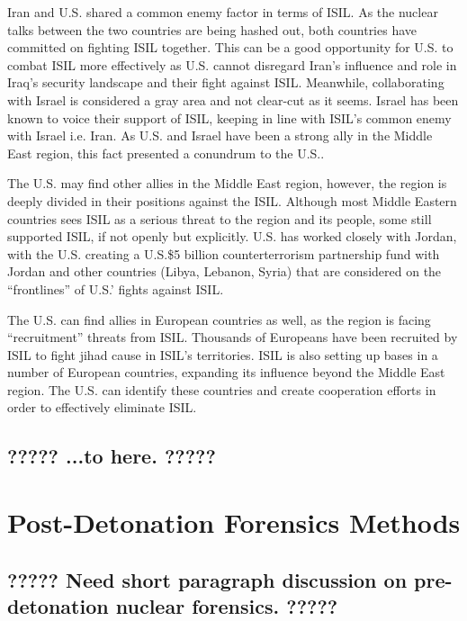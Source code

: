 \documentclass{report}
\begin{document}
Iran and U.S. shared a common enemy factor in terms of ISIL. As the nuclear talks between the two countries are being hashed out, both countries have committed on fighting ISIL together. This can be a good opportunity for U.S. to combat ISIL more effectively as U.S. cannot disregard Iran's influence and role in Iraq's security landscape and their fight against ISIL.
Meanwhile, collaborating with Israel is considered a gray area and not clear-cut as it seems. Israel has been known to voice their support of ISIL, keeping in line with ISIL's common enemy with Israel i.e. Iran. As U.S. and Israel have been a strong ally in the Middle East region, this fact presented a conundrum to the U.S..

The U.S. may find other allies in the Middle East region, however, the region is deeply divided in their positions against the ISIL. Although most Middle Eastern countries sees ISIL as a serious threat to the region and its people, some still supported ISIL, if not openly but explicitly. U.S. has worked closely with Jordan, with the U.S. creating a U.S.\$5 billion counterterrorism partnership fund with Jordan and other countries (Libya, Lebanon, Syria) that are considered on the \enquote{frontlines} of U.S.' fights against ISIL.

The U.S. can find allies in European countries as well, as the region is facing \enquote{recruitment} threats from ISIL. Thousands of Europeans have been recruited by ISIL to fight jihad cause in ISIL's territories. ISIL is also setting up bases in a number of European countries, expanding its influence beyond the Middle East region. The U.S. can identify these countries and create cooperation efforts in order to effectively eliminate ISIL.

\subsection{????? ...to here. ?????}







\section{Post-Detonation Forensics Methods}

\subsection{????? Need short paragraph discussion on pre-detonation nuclear forensics. ?????}
\end{document}

